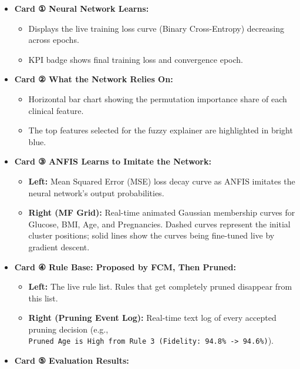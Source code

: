 \begin{itemize}
\tightlist
\item
  \textbf{Card ① Neural Network Learns:}

  \begin{itemize}
  \tightlist
  \item
    Displays the live training loss curve (Binary Cross-Entropy)
    decreasing across epochs.
  \item
    KPI badge shows final training loss and convergence epoch.
  \end{itemize}
\item
  \textbf{Card ② What the Network Relies On:}

  \begin{itemize}
  \tightlist
  \item
    Horizontal bar chart showing the permutation importance share of
    each clinical feature.
  \item
    The top features selected for the fuzzy explainer are highlighted in
    bright blue.
  \end{itemize}
\item
  \textbf{Card ③ ANFIS Learns to Imitate the Network:}

  \begin{itemize}
  \tightlist
  \item
    \textbf{Left:} Mean Squared Error (MSE) loss decay curve as ANFIS
    imitates the neural network's output probabilities.
  \item
    \textbf{Right (MF Grid):} Real-time animated Gaussian membership
    curves for Glucose, BMI, Age, and Pregnancies. Dashed curves
    represent the initial cluster positions; solid lines show the curves
    being fine-tuned live by gradient descent.
  \end{itemize}
\item
  \textbf{Card ④ Rule Base: Proposed by FCM, Then Pruned:}

  \begin{itemize}
  \tightlist
  \item
    \textbf{Left:} The live rule list. Rules that get completely pruned
    disappear from this list.
  \item
    \textbf{Right (Pruning Event Log):} Real-time text log of every
    accepted pruning decision (e.g.,
    \texttt{Pruned\ Age\ is\ High\ from\ Rule\ 3\ (Fidelity:\ 94.8\%\ -\textgreater{}\ 94.6\%)}).
  \end{itemize}
\item
  \textbf{Card ⑤ Evaluation Results:}


\end{itemize}
